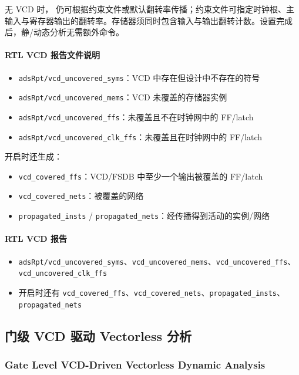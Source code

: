 无 VCD 时， 仍可根据约束文件或默认翻转率传播；约束文件可指定时钟根、主输入与寄存器输出的翻转率。存储器须同时包含输入与输出翻转计数。设置完成后，静/动态分析无需额外命令。

\paragraph{RTL VCD 报告文件说明}
\begin{itemize}
  \item \texttt{adsRpt/vcd\_uncovered\_syms}：VCD 中存在但设计中不存在的符号
  \item \texttt{adsRpt/vcd\_uncovered\_mems}：VCD 未覆盖的存储器实例
  \item \texttt{adsRpt/vcd\_uncovered\_ffs}：未覆盖且不在时钟网中的 FF/latch
  \item \texttt{adsRpt/vcd\_uncovered\_clk\_ffs}：未覆盖且在时钟网中的 FF/latch
\end{itemize}
 开启时还生成：
\begin{itemize}
  \item \texttt{vcd\_covered\_ffs}：VCD/FSDB 中至少一个输出被覆盖的 FF/latch
  \item \texttt{vcd\_covered\_nets}：被覆盖的网络
  \item \texttt{propagated\_insts} / \texttt{propagated\_nets}：经传播得到活动的实例/网络
\end{itemize}


\paragraph{RTL VCD 报告}
\begin{itemize}
  \item \texttt{adsRpt/vcd\_uncovered\_syms}、\texttt{vcd\_uncovered\_mems}、\texttt{vcd\_uncovered\_ffs}、\texttt{vcd\_uncovered\_clk\_ffs}
  \item {} 开启时还有 \texttt{vcd\_covered\_ffs}、\texttt{vcd\_covered\_nets}、\texttt{propagated\_insts}、\texttt{propagated\_nets}
\end{itemize}

\subsection{门级 VCD 驱动 Vectorless 分析}
\subsubsection*{Gate Level VCD-Driven Vectorless Dynamic Analysis}

